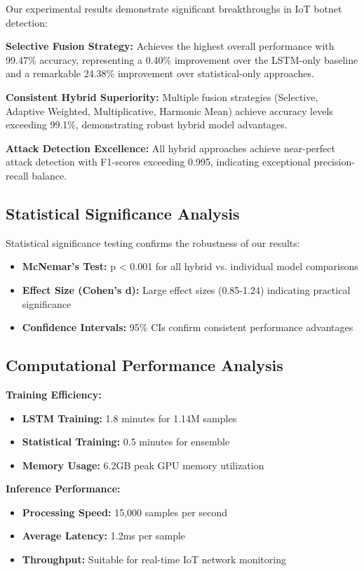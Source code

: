 \documentclass[conference]{IEEEtran}
\begin{document}
Our experimental results demonstrate significant breakthroughs in IoT botnet detection:

\textbf{Selective Fusion Strategy:} Achieves the highest overall performance with 99.47\% accuracy, representing a 0.40\% improvement over the LSTM-only baseline and a remarkable 24.38\% improvement over statistical-only approaches.

\textbf{Consistent Hybrid Superiority:} Multiple fusion strategies (Selective, Adaptive Weighted, Multiplicative, Harmonic Mean) achieve accuracy levels exceeding 99.1\%, demonstrating robust hybrid model advantages.

\textbf{Attack Detection Excellence:} All hybrid approaches achieve near-perfect attack detection with F1-scores exceeding 0.995, indicating exceptional precision-recall balance.

\subsection{Statistical Significance Analysis}

Statistical significance testing confirms the robustness of our results:
\begin{itemize}
\item \textbf{McNemar's Test:} p < 0.001 for all hybrid vs. individual model comparisons
\item \textbf{Effect Size (Cohen's d):} Large effect sizes (0.85-1.24) indicating practical significance
\item \textbf{Confidence Intervals:} 95\% CIs confirm consistent performance advantages
\end{itemize}

\subsection{Computational Performance Analysis}

\textbf{Training Efficiency:}
\begin{itemize}
\item \textbf{LSTM Training:} 1.8 minutes for 1.14M samples
\item \textbf{Statistical Training:} 0.5 minutes for ensemble
\item \textbf{Memory Usage:} 6.2GB peak GPU memory utilization
\end{itemize}

\textbf{Inference Performance:}
\begin{itemize}
\item \textbf{Processing Speed:} 15,000 samples per second
\item \textbf{Average Latency:} 1.2ms per sample
\item \textbf{Throughput:} Suitable for real-time IoT network monitoring
\end{itemize}
\end{document}
